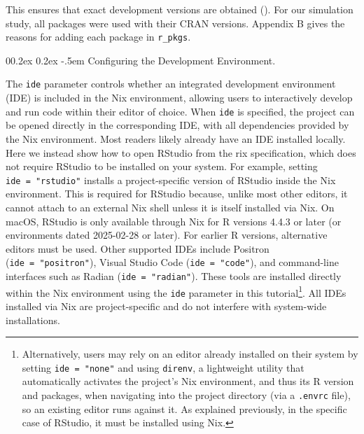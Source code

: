 \documentclass[
  man,
  longtable,
  nolmodern,
  notxfonts,
  notimes,
  colorlinks=true,linkcolor=blue,citecolor=blue,urlcolor=blue]{apa7}
\makeatletter
\renewcommand{\paragraph}{\@startsection{paragraph}{4}{\parindent}%
	{0\baselineskip \@plus 0.2ex \@minus 0.2ex}%
	{-.5em}%
	{\normalfont\normalsize\bfseries\typesectitle}}
\makeatother
\begin{document}
\normalsize

This ensures that exact development versions are obtained
(). For
our simulation study, all packages were used with their CRAN versions.
Appendix B gives the reasons for adding each package in
\texttt{r\_pkgs}.

\paragraph{Configuring the Development
Environment.}\label{configuring-the-development-environment}

The \texttt{ide} parameter controls whether an integrated development
environment (IDE) is included in the Nix environment, allowing users to
interactively develop and run code within their editor of choice. When
\texttt{ide} is specified, the project can be opened directly in the
corresponding IDE, with all dependencies provided by the Nix
environment. Most readers likely already have an IDE installed locally.
Here we instead show how to open RStudio from the rix specification,
which does not require RStudio to be installed on your system. For
example, setting \texttt{ide\ =\ "rstudio"} installs a project-specific
version of RStudio inside the Nix environment. This is required for
RStudio because, unlike most other editors, it cannot attach to an
external Nix shell unless it is itself installed via Nix. On macOS,
RStudio is only available through Nix for R versions 4.4.3 or later (or
environments dated 2025-02-28 or later). For earlier R versions,
alternative editors must be used. Other supported IDEs include Positron
(\texttt{ide\ =\ "positron"}), Visual Studio Code
(\texttt{ide\ =\ "code"}), and command-line interfaces such as Radian
(\texttt{ide\ =\ "radian"}). These tools are installed directly within
the Nix environment using the \texttt{ide} parameter in this
tutorial\footnote{Alternatively, users may rely on an editor already
  installed on their system by setting \texttt{ide\ =\ "none"} and using
  \texttt{direnv}, a lightweight utility that automatically activates
  the project's Nix environment, and thus its R version and packages,
  when navigating into the project directory (via a \texttt{.envrc}
  file), so an existing editor runs against it. As explained previously,
  in the specific case of RStudio, it must be installed using Nix.}. All
IDEs installed via Nix are project-specific and do not interfere with
system-wide installations.

\small
\end{document}
